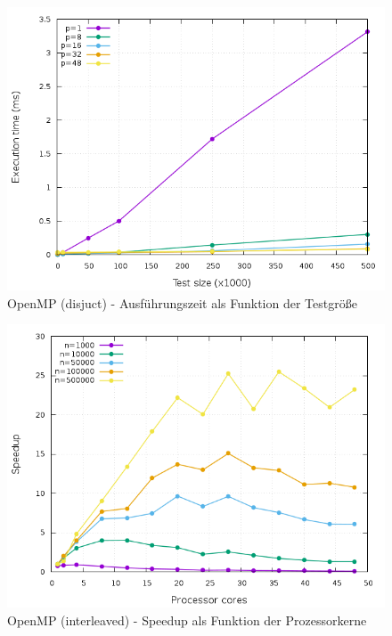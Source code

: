 \begin{figure}[p]
	\centering
	\includegraphics[width=404pt]{resources/plots/OpenMP_Disjunct_cores.png}
	\caption{OpenMP (disjuct) - Ausführungszeit als Funktion der Testgröße}
	\label{OpenMP_Disjunct_cores}
\end{figure}

\begin{figure}[p]
	\centering
	\includegraphics[width=404pt]{resources/plots/OpenMP_Interleaved_sizes.png}
	\caption{OpenMP (interleaved) - Speedup als Funktion der Prozessorkerne}
	\label{OpenMP_Interleaved_sizes}
\end{figure}

